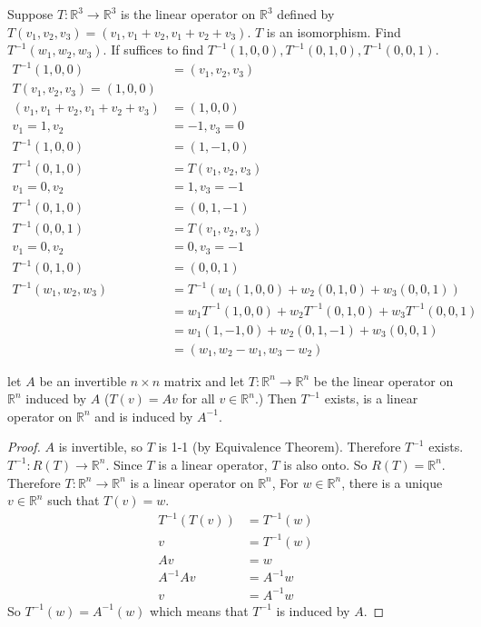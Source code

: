 \documentclass[12pt]{article}
\begin{document}
\begin{example} Suppose $T: \mathbb{R}^3 \to \mathbb{R}^3$ is the linear operator on $\mathbb{R}^3$ defined by $T(v_1, v_2, v_3) = (v_1, v_1 + v_2, v_1 + v_2 + v_3)$. $T$ is an isomorphism. Find $T^{-1}(w_1, w_2, w_3)$. If suffices to find $T^{-1}(1, 0, 0), T^{-1}(0, 1, 0), T^{-1}(0, 0, 1)$. $$\begin{aligned} 
T^{-1}(1, 0, 0) &= (v_1, v_2, v_3) \\ T(v_1, v_2, v_3) = (1, 0, 0) \\ (v_1, v_1 + v_2, v_1 + v_2 + v_3) &= (1, 0, 0) \\ v_1 = 1, v_2 &= -1, v_3 = 0 \\ T^{-1}(1, 0, 0) &= (1, -1, 0) \\ 
T^{-1}(0, 1, 0) &= T(v_1, v_2, v_3) \\ v_1 = 0, v_2 &= 1, v_3 = -1 \\ T^{-1}(0, 1, 0) &= (0, 1, -1) \\ T^{-1}(0, 0, 1) &= T(v_1, v_2, v_3) \\ v_1 = 0, v_2 &= 0, v_3 = -1 \\ T^{-1}(0, 1, 0) &= (0, 0, 1) \\ T^{-1}(w_1, w_2, w_3) &= T^{-1}(w_1(1, 0, 0) + w_2(0, 1, 0) + w_3(0, 0, 1)) \\ &= w_1T^{-1}(1, 0, 0) + w_2T^{-1}(0, 1, 0) + w_3T^{-1}(0, 0, 1) \\ &= w_1(1, -1, 0) + w_2(0, 1, -1) + w_3(0, 0, 1) \\ &= (w_1, w_2 - w_1, w_3 - w_2) \end{aligned} $$ \end{example} 
\begin{theorem} let $A$ be an invertible $n \times n$ matrix and let $T: \mathbb{R}^n \to \mathbb{R}^n$ be the linear operator on $\mathbb{R}^n$ induced by $A$ ($T(v) = Av$ for all $v \in \mathbb{R}^n$.) Then $T^{-1}$ exists, is a linear operator on $\mathbb{R}^n$ and is induced by $A^{-1}$. \end{theorem} 
\begin{proof} $A$ is invertible, so $T$ is 1-1 (by Equivalence Theorem). Therefore $T^{-1}$ exists. $T^{-1}: R(T) \to \mathbb{R}^n$. Since $T$ is a linear operator, $T$ is also onto. So $R(T) = \mathbb{R}^n$. Therefore $T: \mathbb{R}^n \to \mathbb{R}^n$ is a linear operator on $\mathbb{R}^n$, For $w \in \mathbb{R}^n$, there is a unique $v \in \mathbb{R}^n$ such that $T(v) = w$. $$\begin{aligned} T^{-1}(T(v)) &= T^{-1}(w) \\ v &= T^{-1}(w) \\ Av &= w \\ A^{-1}Av &= A^{-1}w \\ v &= A^{-1}w \end{aligned} $$ So $T^{-1}(w) = A^{-1}(w)$ which means that $T^{-1}$ is induced by $A$. \end{proof} 
\end{document}
